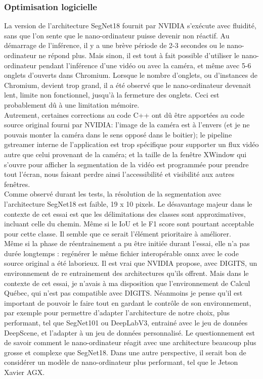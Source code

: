\subsubsection{Optimisation logicielle}
\noindent La version de l'architecture SegNet18 fournit par NVIDIA s'exécute avec fluidité, sans que l'on sente que le nano-ordinateur puisse devenir non réactif. Au démarrage de l'inférence, il y a une brève période de 2-3 secondes ou le nano-ordinateur ne répond plus. Mais sinon, il est tout à fait possible d'utiliser le nano-ordinateur pendant l'inférence d'une vidéo ou avec la caméra, et même avec 5-6 onglets d'ouverts dans Chromium. Lorsque le nombre d'onglets, ou d'instances de Chromium, devient trop grand, il a été observé que le nano-ordinateur devenait lent, limite non fonctionnel, jusqu'à la fermeture des onglets. Ceci est probablement dû à une limitation mémoire.
\vspace{\baselineskip}
\\
\noindent Autrement, certaines corrections au code C++ ont dû être apportées au code source original fourni par NVIDIA: l'image de la caméra est à l'envers (et je ne pouvais monter la caméra dans le sens opposé dans le boitier); le pipeline gstreamer interne de l'application est trop spécifique pour supporter un flux vidéo autre que celui provenant de la caméra; et la taille de la fenêtre XWindow qui s'ouvre pour afficher la segmentation de la vidéo est programmée pour prendre tout l'écran, nous faisant perdre ainsi l'accessibilité et visibilité aux autres fenêtres.
\vspace{\baselineskip}
\\
\noindent Comme observé durant les tests, la résolution de la segmentation avec l'architecture SegNet18 est faible, 19 x 10 pixels. Le désavantage majeur dans le contexte de cet essai est que les délimitations des classes sont approximatives, incluant celle du chemin. Même si le IoU et le F1 score sont pourtant acceptable pour cette classe. Il semble que ce serait l'élément prioritaire à améliorer. 
\vspace{\baselineskip}
\\
\noindent Même si la phase de réentrainement a pu être initiée durant l'essai, elle n'a pas durée longtemps : regénérer le même fichier interopérable \acrshort{onnx} avec le code source original a été laborieux. Il est vrai que NVIDIA propose, avec DIGITS, un environnement de re entrainement des architectures qu'ils offrent. Mais dans le contexte de cet essai, je n'avais à ma disposition que l'environnement de Calcul Québec, qui n'est pas compatible avec DIGITS. Néanmoins je pense qu'il est important de pouvoir le faire tout en gardant le contrôle de son environnement, par exemple pour permettre d'adapter l'architecture de notre choix, plus performant, tel que SegNet101 ou DeepLabV3, entrainé avec le jeu de données DeepScene, et l'adapter à un jeu de données personnalisé. Le questionnement est de savoir comment le nano-ordinateur réagit avec une architecture beaucoup plus grosse et complexe que SegNet18. Dans une autre perspective, il serait bon de considérer un modèle de nano-ordinateur plus performant, tel que le Jetson Xavier AGX.
